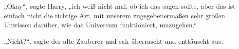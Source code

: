 „Okay“, sagte Harry, „ich weiß nicht mal, ob ich das sagen sollte, aber das ist einfach nicht die richtige Art, mit unserem zugegebenermaßen sehr großen Unwissen darüber, wie das Universum funktioniert, umzugehen.“

„Nicht?“, sagte der alte Zauberer und sah überrascht und enttäuscht aus.

